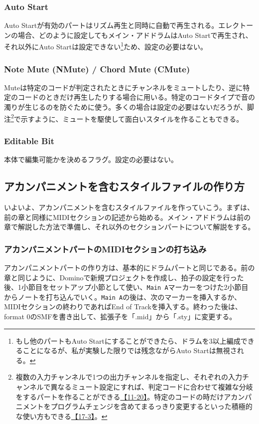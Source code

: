 \documentclass[uplatex, 10pt, dvipdfmx]{jsarticle}
\numberwithin{equation}{section}
\begin{document}
\subsubsection{Auto Start}
Auto Startが有効のパートはリズム再生と同時に自動で再生される。エレクトーンの場合、どのように設定してもメイン・アドドラムはAuto Startで再生され、それ以外にAuto Startは設定できない\footnote{もし他のパートもAuto Startにすることができたら、ドラムを3以上編成できることになるが、私が実験した限りでは残念ながらAuto Startは無視される。}ため、設定の必要はない。

\subsubsection{Note Mute (NMute) / Chord Mute (CMute)}
Muteは特定のコードが判定されたときにチャンネルをミュートしたり、逆に特定のコードのときだけ再生したりする場合に用いる。特定のコードタイプで音の濁りが生じるのを防ぐために使う。多くの場合は設定の必要はないだろうが、脚注\footnote{複数の入力チャンネルで1つの出力チャンネルを指定し、それぞれの入力チャンネルで異なるミュート設定にすれば、判定コードに合わせて複雑な分岐をするパートを作ることができる\href{http://els01stylefile.music.coocan.jp/Stagea_Style/Stagea_Style_P1120a.htm}{【11-20】}。特定のコードの時だけアカンパニメントをプログラムチェンジを含めてまるっきり変更するといった積極的な使い方もできる\href{http://els01stylefile.music.coocan.jp/Stagea_Style/P1703.htm}{【17-3】}。}で示すように、ミュートを駆使して面白いスタイルを作ることもできる。

\subsubsection{Editable Bit}
本体で編集可能かを決めるフラグ。設定の必要はない。

\subsection{アカンパニメントを含むスタイルファイルの作り方}
いよいよ、アカンパニメントを含むスタイルファイルを作っていこう。まずは、前の章と同様にMIDIセクションの記述から始める。メイン・アドドラムは前の章で解説した方法で準備し、それ以外のセクションパートについて解説をする。

\subsubsection{アカンパニメントパートのMIDIセクションの打ち込み}
アカンパニメントパートの作り方は、基本的にドラムパートと同じである。前の章と同じように、Dominoで新規プロジェクトを作成し、拍子の設定を行った後、1小節目をセットアップ小節として使い、\texttt{Main A}マーカーをつけた2小節目からノートを打ち込んでいく。\texttt{Main A}の後は、次のマーカーを挿入するか、MIDIセクションの終わりであればEnd of Trackを挿入する。終わった後は、format 0のSMFを書き出して、拡張子を「.mid」から「.sty」に変更する。
\end{document}

